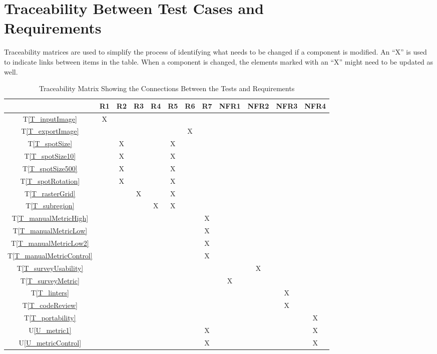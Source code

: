 \documentclass[12pt, titlepage]{article}
\newcommand{\tref}[1]{T\ref{#1}}
\newcommand{\utref}[1]{U\ref{#1}}
\begin{document}
\section{Traceability Between Test Cases and \\ Requirements}
Traceability matrices are used to simplify the process of identifying what needs to be changed 
if a component is modified. An ``X'' is used to indicate links between items in the table. 
When a component is changed, the elements marked with an ``X'' might need to be updated as well.

\begin{table}[h!]
  \centering
  \begin{tabular}{|c|c|c|c|c|c|c|c|c|c|c|c|}
  \hline
    & R1
    & R2
    & R3
    & R4
    & R5
    & R6
    & R7
    & NFR1
    & NFR2
    & NFR3
    & NFR4
  \\ \hline
  \tref{T_inputImage}           &X& & & & & & & & & & \\ \hline
  \tref{T_exportImage}          & & & & & &X& & & & & \\ \hline
  \tref{T_spotSize}             & &X& & &X& & & & & & \\ \hline
  \tref{T_spotSize10}           & &X& & &X& & & & & & \\ \hline
  \tref{T_spotSize500}          & &X& & &X& & & & & & \\ \hline
  \tref{T_spotRotation}         & &X& & &X& & & & & & \\ \hline
  \tref{T_rasterGrid}           & & &X& &X& & & & & & \\ \hline
  \tref{T_subregion}            & & & &X&X& & & & & & \\ \hline
  \tref{T_manualMetricHigh}     & & & & & & &X& & & & \\ \hline
  \tref{T_manualMetricLow}      & & & & & & &X& & & & \\ \hline
  \tref{T_manualMetricLow2}     & & & & & & &X& & & & \\ \hline
  \tref{T_manualMetricControl}  & & & & & & &X& & & & \\ \hline
  \tref{T_surveyUsability}      & & & & & & & & &X& & \\ \hline
  \tref{T_surveyMetric}         & & & & & & & &X& & & \\ \hline
  \tref{T_linters}              & & & & & & & & & &X& \\ \hline
  \tref{T_codeReview}           & & & & & & & & & &X& \\ \hline
  \tref{T_portability}          & & & & & & & & & & &X\\ \hline
  \utref{U_metric1}             & & & & & & &X& & & &X\\ \hline
  \utref{U_metricControl}       & & & & & & &X& & & &X\\ \hline
  \end{tabular}
  \caption{Traceability Matrix Showing the Connections Between the Tests and Requirements}
  \label{Table:A_trace}
\end{table}
\end{document}
